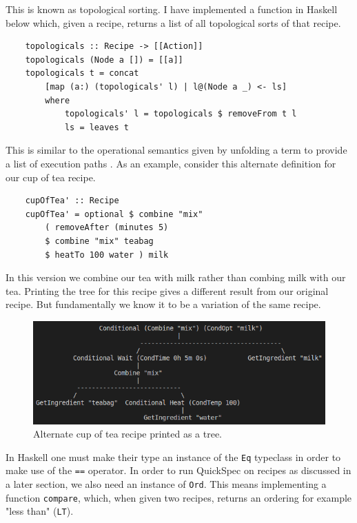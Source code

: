 \documentclass[11pt]{article}
\begin{document}
This is known as topological sorting. I have implemented a
function in Haskell below which, given a recipe, returns a list
of all topological sorts of that recipe.

\begin{lstlisting}
    topologicals :: Recipe -> [[Action]]
    topologicals (Node a []) = [[a]]
    topologicals t = concat
        [map (a:) (topologicals' l) | l@(Node a _) <- ls]
        where
            topologicals' l = topologicals $ removeFrom t l
            ls = leaves t
\end{lstlisting}

This is similar to the operational semantics given by unfolding a
term to provide a list of execution paths \cite{hutton}. As an example,
consider this alternate definition for our cup of tea recipe.

\begin{lstlisting}
    cupOfTea' :: Recipe
    cupOfTea' = optional $ combine "mix" 
        ( removeAfter (minutes 5)
        $ combine "mix" teabag
        $ heatTo 100 water ) milk
\end{lstlisting}

In this version we combine our tea with milk rather than combing milk with our tea.
Printing the tree for this recipe gives a different result from our original recipe.
But fundamentally we know it to be a variation of the same recipe.

\begin{figure}[h]
\includegraphics[width=\textwidth, keepaspectratio]{cupOfTea2.png}
\centering
\caption{Alternate cup of tea recipe printed as a tree.}
\end{figure}

In Haskell one must make their type an instance of the \texttt{Eq} typeclass in
order to make use of the \texttt{==} operator. In order to run QuickSpec on recipes
as discussed in a later section, we also need an instance of \texttt{Ord}.
This means implementing a function \texttt{compare}, which, when given two recipes,
returns an ordering for example "less than" (\texttt{LT}).
\end{document}
